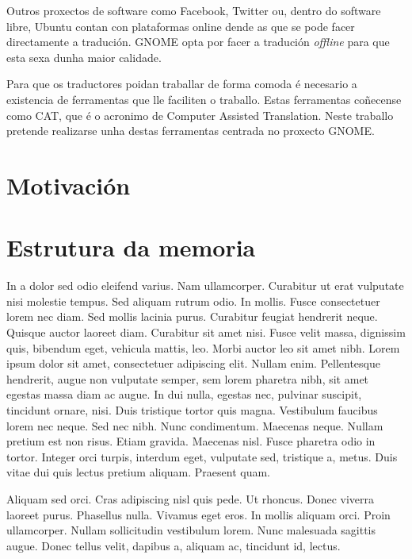 Outros proxectos de software como Facebook, Twitter ou, dentro do software libre, Ubuntu contan con plataformas online dende as que se pode facer directamente a tradución. GNOME opta por facer a tradución \emph{offline} para que esta sexa dunha maior calidade.

Para que os traductores poidan traballar de forma comoda é necesario a existencia de ferramentas que lle faciliten o traballo. Estas ferramentas coñecense como CAT, que é o acronimo de Computer Assisted Translation. Neste traballo pretende realizarse unha destas ferramentas centrada no proxecto GNOME.

\section{Motivación}

\section{Estrutura da memoria}


In a dolor sed odio eleifend varius. Nam ullamcorper. Curabitur ut erat vulputate nisi molestie tempus. Sed aliquam rutrum odio. In mollis. Fusce consectetuer lorem nec diam. Sed mollis lacinia purus. Curabitur feugiat hendrerit neque. Quisque auctor laoreet diam. Curabitur sit amet nisi. Fusce velit massa, dignissim quis, bibendum eget, vehicula mattis, leo. Morbi auctor leo sit amet nibh. Lorem ipsum dolor sit amet, consectetuer adipiscing elit. Nullam enim. Pellentesque hendrerit, augue non vulputate semper, sem lorem pharetra nibh, sit amet egestas massa diam ac augue. In dui nulla, egestas nec, pulvinar suscipit, tincidunt ornare, nisi. Duis tristique tortor quis magna. Vestibulum faucibus lorem nec neque. Sed nec nibh. Nunc condimentum. Maecenas neque. Nullam pretium est non risus. Etiam gravida. Maecenas nisl. Fusce pharetra odio in tortor. Integer orci turpis, interdum eget, vulputate sed, tristique a, metus. Duis vitae dui quis lectus pretium aliquam. Praesent quam.

Aliquam sed orci. Cras adipiscing nisl quis pede. Ut rhoncus. Donec viverra laoreet purus. Phasellus nulla. Vivamus eget eros. In mollis aliquam orci. Proin ullamcorper. Nullam sollicitudin vestibulum lorem. Nunc malesuada sagittis augue. Donec tellus velit, dapibus a, aliquam ac, tincidunt id, lectus.


